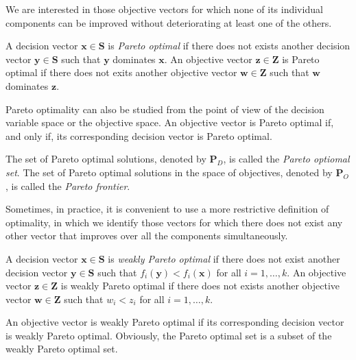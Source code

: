 We are interested in those objective vectors for which none of its individual components can be improved without deteriorating at least one of the others.

\begin{definition}
\label{def:pareto_optimal}
A decision vector $\mathbf{x} \in \mathbf{S}$ is \emph{Pareto optimal} if there does not exists another decision vector $\mathbf{y} \in \mathbf{S}$ such that $\mathbf{y}$ dominates $\mathbf{x}$. An objective vector $\mathbf{z} \in \mathbf{Z}$ is Pareto optimal if there does not exits another objective vector $\mathbf{w} \in \mathbf{Z}$ such that $\mathbf{w}$ dominates $\mathbf{z}$.
\end{definition}

Pareto optimality can also be studied from the point of view of the decision variable space or the objective space. An objective vector is Pareto optimal if, and only if, its corresponding decision vector is Pareto optimal.

\begin{definition}
The set of Pareto optimal solutions, denoted by $\mathbf{P}_D$, is called the \emph{Pareto optiomal set}. The set of Pareto optimal solutions in the space of objectives, denoted by $\mathbf{P}_O$, is called the \emph{Pareto frontier}.
\end{definition}

Sometimes, in practice, it is convenient to use a more restrictive definition of optimality, in which we identify those vectors for which there does not exist any other vector that improves over all the components simultaneously.

\begin{definition}
A decision vector $\mathbf{x} \in \mathbf{S}$ is \emph{weakly Pareto optimal} if there does not exist another decision vector $\mathbf{y} \in \mathbf{S}$ such that $f_i ( \mathbf{y} ) < f_i ( \mathbf{x} )$ for all $i = 1, \ldots, k$. An objective vector $\mathbf{z} \in \mathbf{Z}$ is weakly Pareto optimal if there does not exists another objective vector $\mathbf{w} \in \mathbf{Z}$ such that $w_i < z_i$ for all $i = 1, \ldots, k$.
\end{definition}

An objective vector is weakly Pareto optimal if its corresponding decision vector is weakly Pareto optimal. Obviously, the Pareto optimal set is a subset of the weakly Pareto optimal set.

